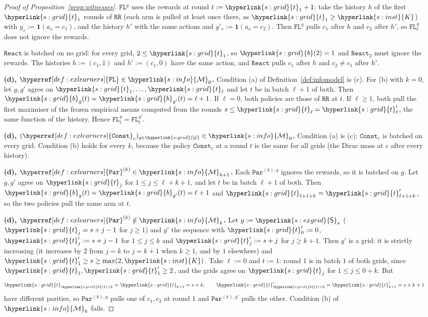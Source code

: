 \documentclass[11pt]{article}
\newcommand{\sy}[2]{{\hyperlink{#1}{#2}}}
\newcommand{\1}{\mathbf{1}}
\newcommand{\Kar}{\sy{s:inst}{K}}
\newcommand{\Gr}{\sy{s:grid}{\mathcal G}}
\newcommand{\tl}{\sy{s:grid}{t}}
\newcommand{\bt}{\sy{s:grid}{b}}
\newcommand{\Sq}{\sy{s:exgrid}{\mathsf S}}
\newcommand{\Mk}[1]{\sy{s:info}{\mathcal M}_{#1}}
\newcommand{\RR}{\hyperref[def:exlearners]{\texttt{RR}}}
\newcommand{\Const}{\hyperref[def:exlearners]{\texttt{Const}}}
\newcommand{\FL}{\hyperref[def:exlearners]{\texttt{FL}}}
\newcommand{\React}{\hyperref[def:exlearners]{\texttt{React}}}
\newcommand{\Par}{\hyperref[def:exlearners]{\texttt{Par}}}
\begin{document}
\begin{proof}[Proof of Proposition~\ref{prop:witnesses}]
$\FL^g$ uses the rewards at round $t:=\tl_1+1$: take the history $h$ of the first $\tl_1$ rounds of
$\RR$ (each arm is pulled at least once there, as $\tl_1\ge\Kar$) with $y_s:=\1(a_s=c_1)$, and the
history $h'$ with the same actions and $y'_s:=\1(a_s=c_2)$. Then $\FL^g$ pulls $c_1$ after $h$ and
$c_2$ after $h'$, so $\FL^g_t$ does not ignore the rewards.

$\React$ is batched on no grid: for every grid, $2\le\tl_1$, so $\bt(2)=1$ and $\React_2$ must ignore
the rewards. The histories $h:=(c_1,1)$ and $h':=(c_1,0)$ have the same action, and $\React$ pulls $c_1$
after $h$ and $c_2\ne c_1$ after $h'$.

\textbf{(d), $\FL\in\Mk{0}$.} Condition (a) of Definition~\ref{def:infomodel} is (c). For (b) with
$k=0$, let $g,g'$ agree on $\tl_1,\dots,\tl_\ell$ and let $t$ be in batch $\ell+1$ of both. Then
$\bt_g(t)=\bt_{g'}(t)=\ell+1$. If $\ell=0$, both policies are those of $\RR$ at $t$. If $\ell\ge1$,
both pull the first maximiser of the frozen empirical means computed from the rounds
$s\le\tl_\ell=\tl'_\ell$, the same function of the history. Hence $\FL^g_t=\FL^{g'}_t$.

\textbf{(d), $(\Const_c)_{g\in\Gr}\in\Mk{0}$.} Condition (a) is (c): $\Const_c$ is batched on every
grid. Condition (b) holds for every $k$, because the policy $\Const_c$ at a round $t$ is the same for
all grids (the Dirac mass at $c$ after every history).

\textbf{(d), $\Par^{(k)}\in\Mk{k+1}$.} Each $\Par^{(k),g}$ ignores the rewards, so it is batched on
$g$. Let $g,g'$ agree on $\tl_j$ for $1\le j\le\ell+k+1$, and let $t$ be in batch $\ell+1$ of both.
Then $\bt_g(t)=\bt_{g'}(t)=\ell+1$ and $\tl_{\ell+1+k}=\tl'_{\ell+1+k}$, so the two policies pull the
same arm at $t$.

\textbf{(d), $\Par^{(k)}\notin\Mk{k}$.} Let $g:=\Sq_s$ ($\tl_j=s+j-1$ for $j\ge1$)
and $g'$ the sequence with $\tl'_0:=0$, $\tl'_j:=s+j-1$ for $1\le j\le k$ and $\tl'_j:=s+j$ for
$j\ge k+1$. Then $g'$ is a grid: it is strictly increasing (it increases by $2$ from $j=k$ to $j=k+1$
when $k\ge1$, and by $1$ elsewhere) and $\tl'_1\ge s\ge\max(2,\Kar)$. Take $\ell:=0$ and $t:=1$:
round $1$ is in batch $1$ of both grids, since $\tl_1,\tl'_1\ge2$, and the grids agree on $\tl_j$
for $1\le j\le0+k$. But
\begin{equation*}
  \tl_{\bt(1)+k}=\tl_{k+1}=s+k,\qquad \tl'_{\bt(1)+k}=\tl'_{k+1}=s+k+1
\end{equation*}
have different parities, so $\Par^{(k),g}$ pulls one of $c_1,c_2$ at round $1$ and $\Par^{(k),g'}$
pulls the other. Condition (b) of $\Mk{k}$ fails.


\end{proof}
\end{document}
